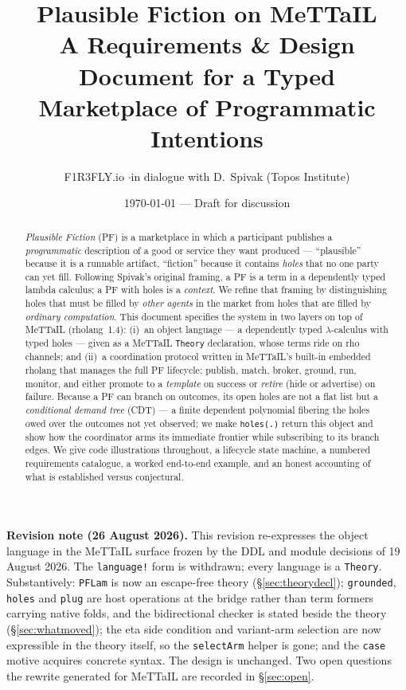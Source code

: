 \documentclass[11pt]{article}
\title{\vspace{-2.5em}\color{accent}\textbf{Plausible Fiction on MeTTaIL}\\[0.2em]
  \large\color{ink}\textnormal{A Requirements \& Design Document for a Typed Marketplace of Programmatic Intentions}}
\author{\normalsize F1R3FLY.io \quad$\cdot$\quad in dialogue with D.~Spivak (Topos Institute)}
\date{\normalsize\today \;\; --- \;\; Draft for discussion}
\begin{document}
\maketitle
\thispagestyle{fancy}

\begin{abstract}
\noindent
\emph{Plausible Fiction} (PF) is a marketplace in which a participant publishes a
\emph{programmatic} description of a good or service they want produced --- ``plausible'' because it
is a runnable artifact, ``fiction'' because it contains \emph{holes} that no one party can yet fill.
Following Spivak's original framing, a PF is a term in a dependently typed lambda calculus; a PF with
holes is a \emph{context}. We refine that framing by distinguishing holes that must be filled by
\emph{other agents} in the market from holes that are filled by \emph{ordinary computation}. This
document specifies the system in two layers on top of MeTTaIL (rholang~1.4): (i)~an object language
--- a dependently typed $\lambda$-calculus with typed holes --- given as a MeTTaIL
\lstinline[language=mettail,basicstyle=\ttfamily\small]|Theory| declaration, whose terms ride on
rho channels; and (ii)~a coordination protocol written in MeTTaIL's built-in embedded rholang that
manages the full PF lifecycle: publish, match, broker, ground, run, monitor, and either promote to a
\emph{template} on success or \emph{retire} (hide or advertise) on failure. Because a PF can branch
on outcomes, its open holes are not a flat list but a \emph{conditional demand tree} (CDT) --- a
finite dependent polynomial fibering the holes owed over the outcomes not yet observed; we make
\lstinline[language=mettail,basicstyle=\ttfamily\small]|holes(.)| return this object and show how the
coordinator arms its immediate frontier while subscribing to its branch edges. We give code
illustrations throughout, a lifecycle state machine, a numbered requirements catalogue, a worked
end-to-end example, and an honest accounting of what is established versus conjectural.
\end{abstract}

\begin{center}
\begin{minipage}{0.95\linewidth}\small
\textbf{Revision note (26 August 2026).} This revision re-expresses the object language in the
MeTTaIL surface frozen by the DDL and module decisions of 19 August 2026. The
\lstinline[language=mettail,basicstyle=\ttfamily\small]|language!| form is withdrawn; every language
is a \texttt{Theory}. Substantively: \texttt{PFLam} is now an escape-free theory (\S\ref{sec:theorydecl});
\texttt{grounded}, \texttt{holes} and \texttt{plug} are host operations at the bridge rather than term
formers carrying native folds, and the bidirectional checker is stated beside the theory
(\S\ref{sec:whatmoved}); the eta side condition and variant-arm selection are now expressible in the
theory itself, so the \texttt{selectArm} helper is gone; and the \texttt{case} motive acquires
concrete syntax. The design is unchanged. Two open questions the rewrite generated for MeTTaIL are
recorded in \S\ref{sec:open}.
\end{minipage}
\end{center}
\vspace{0.6em}
\end{document}

